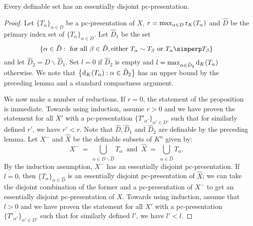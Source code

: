 \begin{prop} \label{essdispre}
Every definable set has an essentially disjoint pc-presentation.
\end{prop}
 
\begin{proof}
Let $ \{ T_\alpha\}_{ \alpha \in D}$ be a pc-presentation of $X$, $r= \max_{ \alpha \in D} \mathrm{r}_K(T_\alpha)$ and  $\hat{D}$ be the primary index set of $ \{ T_\alpha\}_{ \alpha \in D}$. Let  $ \hat{D}_1 $ be the set $$\{ \alpha \in \hat{D}: \text{ for all } \beta \in \hat{D}, \text{either } T_\alpha \sim T_\beta \text{ or } T_\alpha \simperp T_\beta\} $$ and let $ \hat{D}_2 = D\backslash \hat{D}_1$. Set $l=0$ if $\hat{D}_2$ is empty and $l = \max_{ \alpha \in \hat{D}_2} \mathrm{d}_K(T_\alpha)$ otherwise. We note that $\big\{ \mathrm{d}_K(T_\alpha):  \alpha \in \hat{D}_2 \big\}$ has an upper bound by the preceding lemma and a standard compactness argument.

We now make a number of reductions. If $r = 0$, the statement of the proposition is immediate. Towards using induction,  assume $r>0$ and we have proven the statement for all $X'$ with a pc-presentation $ \{ {T'}_{\alpha'}\}_{ \alpha' \in D'}$ such that for similarly defined $r'$, we have $r'<r$. Note that $\hat{D}, \hat{D}_1$ and $\hat{D}_2$ are definable by the preceding lemma. Let $X^-$ and $\hat{X}$ be the definable subsets of $K^n$ given by:
$$X^-\ =\ \bigcup_{ \alpha \in D\backslash \hat{D}}T_\alpha\ \text{ and }\ \hat{X}\ =\ \bigcup_{ \alpha \in \hat{D}}T_\alpha. $$
By the induction assumption, $X^-$ has an essentially disjoint pc-presentation. If $l=0$, then $\{ T_\alpha\}_{ \alpha \in \hat{D}}$ is an essentially disjoint pc-presentation of $\hat{X}$; we can take the disjoint combination of the former and a pc-presentation of $X^-$ to get an essentially disjoint pc-presentation of $X$. Towards using induction, assume that $l>0$ and we have proven the statement for all $X'$ with a pc-presentation $ \{ {T'}_{\alpha'}\}_{ \alpha' \in D'}$ such that for similarly defined $l'$, we have $l'<l$.


\end{proof}

